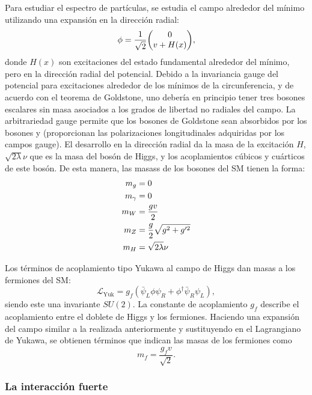 Para estudiar el espectro de partículas, se estudia el campo alrededor del mínimo utilizando una expansión en la dirección radial:
\begin{equation}
    \phi = \frac{1}{\sqrt{2}} \mqty(0 \\ v + H(x)),
\end{equation}
donde \(H(x)\) son excitaciones del estado fundamental alrededor del mínimo, pero en la dirección radial del potencial.
Debido a la invariancia gauge del potencial para excitaciones alrededor de los mínimos de la circunferencia, y de acuerdo con el teorema de Goldstone, uno debería en principio tener tres bosones escalares sin masa asociados a los grados de libertad no radiales del campo. La arbitrariedad gauge permite que los bosones de Goldstone sean absorbidos por los bosones \Wboson y \Zboson (proporcionan las polarizaciones longitudinales adquiridas por los campos gauge). El desarrollo en la dirección radial da la masa de la excitación \(H\), \(\sqrt{2\lambda}\nu\) que es la masa del bosón de Higgs, y los acoplamientos cúbicos y cuárticos de este bosón. De esta manera, las masass de los bosones del \ac{SM} tienen la forma:
\begin{align}
    m_{g} &= 0\\
    m_{\gamma} &= 0\\
    m_{W} & = \frac{g v}{2}\\
    m_{Z} & = \frac{g}{2} \sqrt{g^2 + g'^2}\\
    m_{H} & = \sqrt{2\lambda}\nu
\end{align}

Los términos de acoplamiento tipo Yukawa al campo de Higgs dan masas a los fermiones del \ac{SM}:
\begin{equation}
    \mathcal{L}_{\text{Yuk}} = g_f \left(\bar{\psi}_L \phi \psi_R + \phi^{\dagger} \bar{\psi}_R \psi_L\right),
\end{equation}
siendo este una invariante \(SU(2)\). La constante de acoplamiento \(g_f\) describe el acoplamiento entre el doblete de Higgs y los fermiones. Haciendo una expansión del campo similar a la realizada anteriormente y sustituyendo en el Lagrangiano de Yukawa, se obtienen términos que indican las masas de los fermiones como
\begin{equation}
    m_f = \frac{g_f v}{\sqrt{2}}.
\end{equation}


\subsubsection{La interacci\'on fuerte}
\label{subsubsec:theory:sm:mathematical:qcd}

